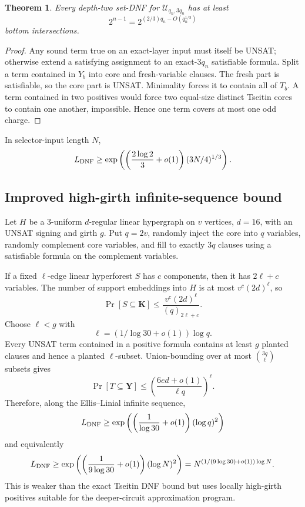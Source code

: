 \documentclass[11pt]{article}
\newtheorem{theorem}{Theorem}
\begin{document}
\begin{theorem}
Every depth-two set-DNF for $\mathcal U_{q_n,3q_n}$ has at least
\[
2^{n-1}=2^{(2/3)q_n-O(q_n^{1/3})}
\]
bottom intersections.
\end{theorem}
\begin{proof}
Any sound term true on an exact-layer input must itself be UNSAT; otherwise extend a satisfying assignment to an exact-$3q_n$ satisfiable formula. Split a term contained in $Y_b$ into core and fresh-variable clauses. The fresh part is satisfiable, so the core part is UNSAT. Minimality forces it to contain all of $T_b$. A term contained in two positives would force two equal-size distinct Tseitin cores to contain one another, impossible. Hence one term covers at most one odd charge.
\end{proof}
In selector-input length $N$,
\[
L_{\rm DNF}\ge\exp\left(\left(\frac{2\log2}{3}+o(1)\right)(3N/4)^{1/3}\right).
\]

\subsection{Improved high-girth infinite-sequence bound}
Let $H$ be a 3-uniform $d$-regular linear hypergraph on $v$ vertices, $d=16$, with an UNSAT signing and girth $g$. Put $q=2v$, randomly inject the core into $q$ variables, randomly complement core variables, and fill to exactly $3q$ clauses using a satisfiable formula on the complement variables.

If a fixed $\ell$-edge linear hyperforest $S$ has $c$ components, then it has $2\ell+c$ variables. The number of support embeddings into $H$ is at most $v^c(2d)^\ell$, so
\[
\Pr[S\subseteq\mathbf K]\le\frac{v^c(2d)^\ell}{(q)_{2\ell+c}}.
\]
Choose $\ell<g$ with
\[
\ell=(1/\log30+o(1))\log q.
\]
Every UNSAT term contained in a positive formula contains at least $g$ planted clauses and hence a planted $\ell$-subset. Union-bounding over at most $\binom{3q}{\ell}$ subsets gives
\[
\Pr[T\subseteq\mathbf Y]\le\left(\frac{6ed+o(1)}{\ell q}\right)^\ell.
\]
Therefore, along the Ellis--Linial infinite sequence,
\[
L_{\rm DNF}\ge\exp\left(\left(\frac1{\log30}+o(1)\right)(\log q)^2\right)
\]
and equivalently
\[
L_{\rm DNF}\ge\exp\left(\left(\frac1{9\log30}+o(1)\right)(\log N)^2\right)=N^{(1/(9\log30)+o(1))\log N}.
\]
This is weaker than the exact Tseitin DNF bound but uses locally high-girth positives suitable for the deeper-circuit approximation program.
\end{document}
